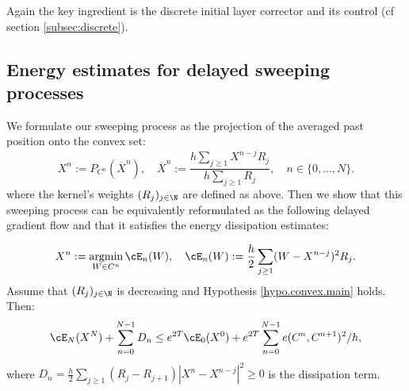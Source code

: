 \documentclass[]{jnsao}
\renewcommand{\tr}{R}
\DeclareMathOperator*{\argmin}{argmin}
\begin{document}
\noindent Again the key ingredient is the discrete initial layer corrector and its 
control (cf section \ref{subsec:discrete}).

\subsection{Energy estimates for delayed sweeping processes}

We formulate our sweeping process as the projection of the averaged 
past position onto the convex set:
$$
X^n:= P_{C^n} (\overline{X}^n), \quad 
\overline{X}^n :=  \frac{h \sum_{j\geq 1} X^{n-j} \tr_j}{h \sum_{j\geq 1} \tr_j}, \quad n \in \{0, \ldots, N\}.	
$$
where the kernel's weights $(\tr_j)_{j\in \N}$ are defined as above.
Then we show that this sweeping process can be equivalently reformulated as the following
delayed gradient flow \cite{Mi.5} and that it satisfies the energy dissipation estimates:
\begin{proposition}\label{prop.nrj.main}
\begin{equation}\label{eq.sweeping.main}
	 X^n := \argmin_{W \in C^n} \cE_n(W), \quad \cE_n(W) := \frac{h}{2}\sum_{j\geq1} (W-X^{n-j})^2 \tr_j.
	\end{equation}
	Assume that $(\tr_j)_{j\in \N}$ is decreasing and Hypothesis \ref{hypo.convex.main} holds. 
	Then:	
	\[
	\cE_{N}(X^{N}) +  \sum_{n=0}^{N-1} D_n \le e^{2 T} \cE_{0}(X^0) + e^{2 T} \sum_{n=0}^{N-1} e(C^n,C^{n+1})^2/h,
	\]
	where $D_n= \frac{h}{2} \sum_{j\ge1} (\tr_{j}-\tr_{j+1}) | X^{n} - X^{n-j}|^2 \geq 0$ is the dissipation term.
\end{proposition}

\end{document}
